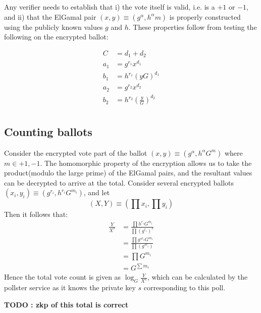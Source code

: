 Any verifier needs to establish that i)
the vote itself is valid, i.e. is a $+1$ or $-1$, and ii) that the ElGamal
pair $(x,y) \equiv (g^\alpha, h^\alpha m)$ is properly constructed using the
publicly known values $g$ and $h$.  These properties follow from testing
the following on the encrypted ballot:

\begin{equation} \label{eq4}
\begin{split}
C & = d_1 + d_2  \\
a_1 & = g^{r_1} x^{d_1}  \\
b_1 & = h^{r_1} (yG)^{d_1} \\
a_2 & = g^{r_2} x^{d_2} \\
b_2 & = h^{r_2}(\frac{y}{G})^{d_2} \\
\end{split}
\end{equation}


\subsection{Counting ballots}

Consider the encrypted vote part of the ballot $(x,y) \equiv (g^\alpha, h^\alpha G^m)$
where $m \in {+1, -1}$.
The homomorphic property of the encryption allows us to take the product(modulo
the large prime) of the ElGamal pairs, and the resultant values can be decrypted to
arrive at the total.   Consider several encrypted ballots
$(x_i,y_i) \equiv (g^{r_i} , h^{r_i} G^{m_i})$, and let 
\[
(X,Y) \equiv (\prod x_i , \prod y_i) 
\]
Then it follows that:
\begin{equation} \label{eq5}
\begin{split}
  \frac{Y}{X^s} & = \frac{\prod h^{r_i} G^{m_i}}{ \prod (g^{r_i})^s } \\
  & =  \frac{\prod g^{sr_i} G^{m_i}}{ \prod (g^{sr_i}) } \\
  & = \prod G^{m_i} \\
   & = G^{\sum m_i}
\end{split}
\end{equation}
Hence the total vote count is given as $\log_G \frac{Y}{X^s}$, which can be
calculated by the pollster service as it knows the private key $s$ corresponding
to this poll.


\bf{TODO : zkp of this total is correct}


